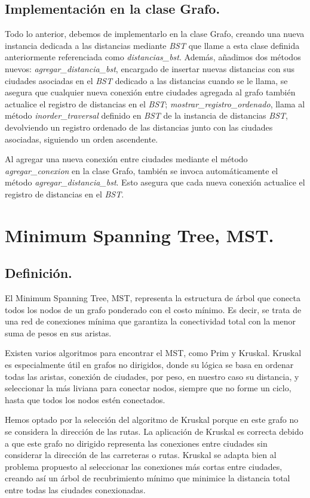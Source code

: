 \documentclass[12pt,oneside]{book}
\begin{document}
   \subsection{Implementación en la clase Grafo.}
Todo lo anterior, debemos de implementarlo en la clase Grafo, creando una nueva instancia dedicada a las distancias mediante \textit{BST} que llame a esta clase definida anteriormente referenciada como \textit{distancias\_bst}.
Además, añadimos dos métodos nuevos: \textit{agregar\_distancia\_bst}, encargado de insertar nuevas distancias con sus ciudades asociadas en el \textit{BST} dedicado a las distancias cuando se le llama, se asegura que cualquier nueva conexión entre ciudades agregada al grafo también actualice el registro de distancias en el \textit{BST}; \textit{mostrar\_registro\_ordenado},  llama al método \textit{inorder\_traversal} definido en \textit{BST} de la instancia de distancias \textit{BST}, devolviendo un registro ordenado de las distancias junto con las ciudades asociadas, siguiendo un orden ascendente.

Al agregar una nueva conexión entre ciudades mediante el método \textit{agregar\_conexion} en la clase Grafo, también se invoca automáticamente el método \textit{agregar\_distancia\_bst}. Esto asegura que cada nueva conexión actualice el registro de distancias en el \textit{BST}.
\newpage
\section{Minimum Spanning Tree, MST.}
    \subsection{Definición.}
El Minimum Spanning Tree, MST, representa la estructura de árbol que conecta todos los nodos de un grafo ponderado con el costo mínimo. Es decir, se trata de una red de conexiones mínima que garantiza la conectividad total con la menor suma de pesos en sus aristas.

Existen varios algoritmos para encontrar el MST, como Prim y Kruskal. Kruskal es especialmente útil en grafos no dirigidos, donde su lógica se basa en ordenar todas las aristas, conexión de ciudades, por peso, en nuestro caso su distancia, y seleccionar la más liviana para conectar nodos, siempre que no forme un ciclo, hasta que todos los nodos estén conectados.

Hemos optado por la selección del algoritmo de Kruskal porque en este grafo no se considera la dirección de las rutas. La aplicación de Kruskal es correcta debido a que este grafo no dirigido representa las conexiones entre ciudades sin considerar la dirección de las carreteras o rutas. Kruskal se adapta bien al problema propuesto al seleccionar las conexiones más cortas entre ciudades, creando así un árbol de recubrimiento mínimo que minimice la distancia total entre todas las ciudades conexionadas.
\end{document}
